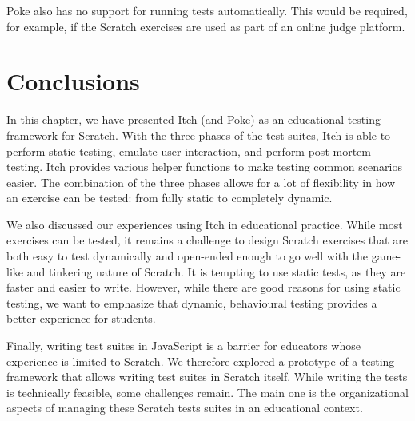 \documentclass[../main]{subfiles}
\begin{document}
Poke also has no support for running tests automatically.
This would be required, for example, if the Scratch exercises are used as part of an online judge platform.

\section{Conclusions}\label{sec:conclusion-and-future-work}

In this chapter, we have presented Itch (and Poke) as an educational testing framework for Scratch.
With the three phases of the test suites, Itch is able to perform static testing, emulate user interaction, and perform post-mortem testing.
Itch provides various helper functions to make testing common scenarios easier.
The combination of the three phases allows for a lot of flexibility in how an exercise can be tested: from fully static to completely dynamic.

We also discussed our experiences using Itch in educational practice.
While most exercises can be tested, it remains a challenge to design Scratch exercises that are both easy to test dynamically and open-ended enough to go well with the game-like and tinkering nature of Scratch.
It is tempting to use static tests, as they are faster and easier to write.
However, while there are good reasons for using static testing, we want to emphasize that dynamic, behavioural testing provides a better experience for students.

Finally, writing test suites in JavaScript is a barrier for educators whose experience is limited to Scratch.
We therefore explored a prototype of a testing framework that allows writing test suites in Scratch itself.
While writing the tests is technically feasible, some challenges remain.
The main one is the organizational aspects of managing these Scratch tests suites in an educational context.
\end{document}
